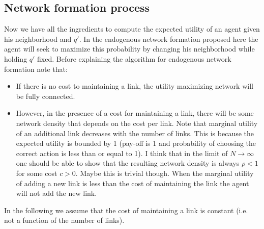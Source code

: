 \documentclass[10pt,a4paper]{article}
\begin{document}
\subsection{Network formation process}
Now we have all the ingredients to compute the expected utility of an agent given his neighborhood and $q'$. In the endogenous network formation proposed here the agent will seek to maximize this probability by changing his neighborhood while holding $q'$ fixed. Before explaining the algorithm for endogenous network formation note that:
\begin{itemize}
\item If there is no cost to maintaining a link, the utility maximizing network will be fully connected.
\item However, in the presence of a cost for maintaining a link, there will be some network density that depends on the cost per link. Note that marginal utility of an additional link decreases with the number of links. This is because the expected utility is bounded by 1 (pay-off is 1 and probability of choosing the correct action is less than or equal to 1). I think that in the limit of $N \rightarrow \infty$ one should be able to show that the resulting network density is always $\rho < 1$ for some cost $c > 0$. Maybe this is trivial though. When the marginal utility of adding a new link is less than the cost of maintaining the link the agent will not add the new link.
\end{itemize}
In the following we assume that the cost of maintaining a link is constant (i.e. not a function of the number of links).
\end{document}
